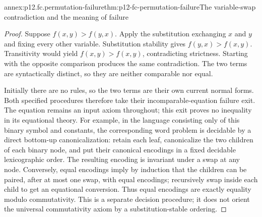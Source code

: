 \begin{annexitem}{annex:p12.fc.permutation-failure}{thm:p12-fc-permutation-failure}{The variable-swap contradiction and the meaning of failure}
\begin{proof}
Suppose \(f(x,y)>f(y,x)\). Apply the substitution exchanging
\(x\) and \(y\) and fixing every other variable. Substitution
stability gives \(f(y,x)>f(x,y)\). Transitivity would yield
\(f(x,y)>f(x,y)\), contradicting strictness. Starting with the
opposite comparison produces the same contradiction. The two
terms are syntactically distinct, so they are neither comparable
nor equal.

Initially there are no rules, so the two terms are their own
current normal forms. Both specified procedures therefore take
their incomparable-equation failure exit. The equation remains an
input axiom throughout; this exit proves no inequality in its
equational theory. For example, in the language consisting only of
this binary symbol and constants, the corresponding word problem
is decidable by a direct bottom-up canonicalization: retain each
leaf, canonicalize the two children of each binary node, and put
their canonical encodings in a fixed decidable lexicographic order.
The resulting encoding is invariant under a swap at any node.
Conversely, equal encodings imply by induction that the children
can be paired, after at most one swap, with equal encodings;
recursively swap inside each child to get an equational conversion.
Thus equal encodings are exactly equality modulo commutativity.
This is a separate decision procedure; it does not orient the
universal commutativity axiom by a substitution-stable ordering.
\end{proof}
\end{annexitem}
